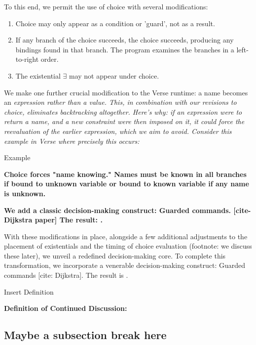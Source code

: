 \documentclass[manuscript,screen,review, 12pt]{acmart}
\begin{document}
\begin{outline}[enumerate]
        To this end, we permit the use of choice with several modifications:

        \begin{enumerate}
        \item Choice may only appear as a condition or 'guard', not as a result.
        \item If any branch of the choice succeeds, the choice succeeds,
        producing any bindings found in that branch. The program examines the
        branches in a left-to-right order.
        \item The existential $\exists$ may not appear under choice.
        \end{enumerate}

        We make one further crucial modification to the Verse runtime: a name
        becomes an \it{expression} rather than a \it{value}. This, in
        combination with our revisions to choice, eliminates backtracking
        altogether. Here's why: if an expression were to return a name, and a
        new constraint were then imposed on it, it could force the reevaluation
        of the earlier expression, which we aim to avoid. Consider this example
        in Verse where precisely this occurs:

     Example 

        \bf{Choice forces "name knowing." Names must be known in all branches 
        if bound to unknown variable or bound to known variable if any name 
        is unknown}.
        
         \bf{We add a classic decision-making construct: Guarded commands. }
        [cite- Dijkstra paper]
         \bf{The result: \VMinus. }
        
        With these modifications in place, alongside a few additional
        adjustments to the placement of existentials and the timing of choice
        evaluation (footnote: we discuss these later), we unveil a redefined decision-making core. To complete this
        transformation, we incorporate a venerable decision-making construct:
        Guarded commands [cite: Dijkstra]. The result is \VMinus. 
        
        Insert Definition

     \bf{Definition of \VMinus}
     \bf{Continued Discussion:}

    \subsection{Maybe a subsection break here}
    

\end{outline}
\end{document}
